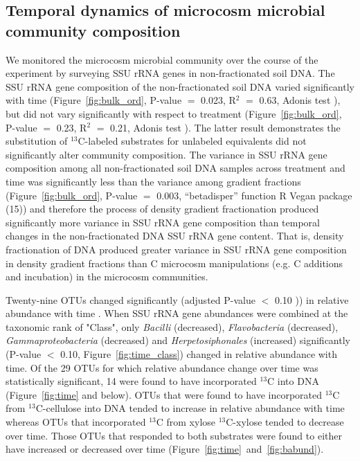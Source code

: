 \subsection{Temporal dynamics of microcosm microbial community composition}
We monitored the microcosm microbial community over the course of the
experiment by surveying SSU rRNA genes in non-fractionated soil DNA. The SSU
rRNA gene composition of the non-fractionated soil DNA varied significantly
with time (Figure~\ref{fig:bulk_ord}, P-value $=$ 0.023, R$^{2}$ $=$ 0.63,
Adonis test \citet{Anderson2001a}), but did not vary significantly with respect
to treatment (Figure~\ref{fig:bulk_ord}, P-value $=$ 0.23, R$^{2}$ $=$ 0.21,
Adonis test \citet{Anderson2001a}). The latter result demonstrates the
substitution of $^{13}$C-labeled substrates for unlabeled equivalents did not
significantly alter community composition. The variance in SSU rRNA gene
composition among all non-fractionated soil DNA samples across treatment and
time was significantly less than the variance among gradient fractions
(Figure~\ref{fig:bulk_ord}, P-value $=$ 0.003, “betadisper” function R Vegan
package \citet{oksanen2007vegan} (15)) and therefore the process of density
gradient fractionation produced significantly more variance in SSU rRNA gene
composition than temporal changes in the non-fractionated DNA SSU rRNA gene
content. That is, density fractionation of DNA produced greater variance in SSU
rRNA gene composition in density gradient fractions than C microcosm
manipulations (e.g. C additions and incubation) in the microcosm communities.

Twenty-nine OTUs changed significantly (adjusted P-value $<$ 0.10
\citet{YBenjamini1995})) in relative abundance with time . When SSU rRNA gene
abundances were combined at the taxonomic rank of "Class", only
\textit{Bacilli} (decreased), \textit{Flavobacteria} (decreased),
\textit{Gammaproteobacteria} (decreased) and \textit{Herpetosiphonales}
(increased) significantly (P-value $<$ 0.10, Figure~\ref{fig:time_class})
changed in relative abundance with time. Of the 29 OTUs for which relative
abundance change over time was statistically significant, 14 were found to have
incorporated $^{13}$C into DNA (Figure~\ref{fig:time} and below). OTUs that
were found to have incorporated $^{13}$C from $^{13}$C-cellulose into DNA
tended to increase in relative abundance with time whereas OTUs that
incorporated $^{13}$C from xylose $^{13}$C-xylose tended to decrease over time.
Those OTUs that responded to both substrates were found to either have
increased or decreased over time (Figure~\ref{fig:time}~and~\ref{fig:babund}).

